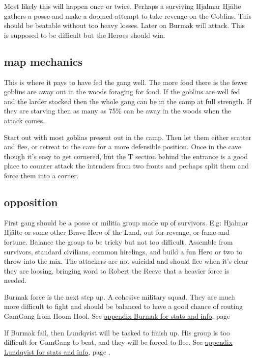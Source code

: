 Most likely this will happen once or twice. Perhaps a surviving Hjalmar Hjälte gathers a posse and make a doomed attempt to take revenge on the Goblins. This should be beatable without too heavy losses.
Later on Burmak will attack. This is supposed to be difficult but the Heroes should win.


\subsection*{map mechanics}

This is where it pays to have fed the gang well. The more food there is the fewer goblins are away out in the woods foraging for food. If the goblins are well fed and the larder stocked then the whole gang can be in the camp at full strength. If they are starving then as many as 75\% can be away in the woods when the attack comes.

Start out with most goblins present out in the camp. Then let them either scatter and flee, or retreat to the cave for a more defensible position. Once in the cave though it's easy to get cornered, but the T section behind the entrance is a good place to counter attack the intruders from two fronts and perhaps split them and force them into a corner.


\subsection*{opposition}

First gang should be a posse or militia group made up of survivors. E.g: Hjalmar Hjälte or some other Brave Hero of the Land, out for revenge, or fame and fortune. Balance the group to be tricky but not too difficult. Assemble from survivors, standard civilians, common hirelings, and build a fun Hero or two to throw into the mix.
The attackers are not suicidal and should flee when it's clear they are loosing, bringing word to Robert the Reeve that a heavier force is needed.

Burmak force is the next step up. A cohesive military squad. They are much more difficult to fight and should be balanced to have a good chance of routing GamGang from Hoom Hool. See \hyperref[appendixburmak]{appendix Burmak for stats and info}, page \pageref{appendixburmak}

If Burmak fail, then Lundqvist will be tasked to finish up. His group is too difficult for GamGang to beat, and they will be forced to flee. See \hyperref[appendixlundqvist]{appendix Lundqvist for stats and info}, page \pageref{appendixlundqvist}.

